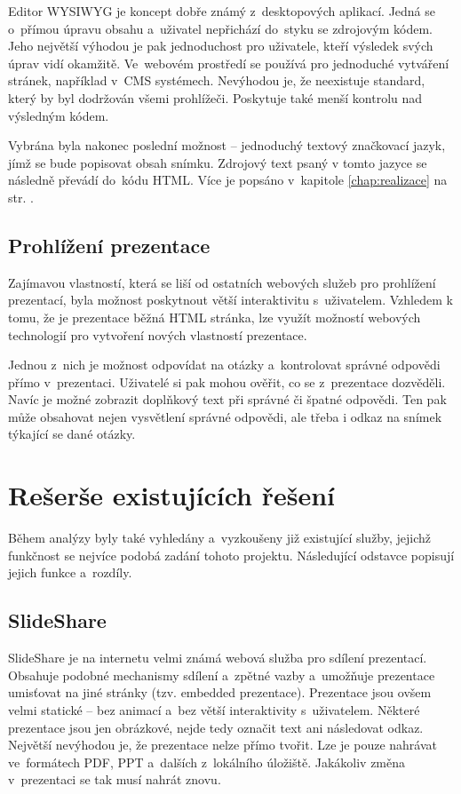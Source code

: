 \documentclass[11pt,twoside,a4paper]{book}
\begin{document}
Editor WYSIWYG je koncept dobře známý z~desktopových aplikací. Jedná se o~přímou úpravu obsahu a~uživatel nepřichází do~styku se zdrojovým kódem. Jeho největší výhodou je pak jednoduchost pro uživatele, kteří výsledek svých úprav vidí okamžitě. Ve~webovém prostředí se používá pro jednoduché vytváření stránek, například v~CMS systémech. Nevýhodou je, že neexistuje standard, který by byl dodržován všemi prohlížeči. Poskytuje také menší kontrolu nad výsledným kódem. 

Vybrána byla nakonec poslední možnost – jednoduchý textový značkovací jazyk, jímž se bude popisovat obsah snímku. Zdrojový text psaný v tomto jazyce se následně převádí do~kódu HTML. Více je popsáno v~kapitole \ref{chap:realizace}  na str. \pageref{chap:realizace}.

\subsection{Prohlížení prezentace}
Zajímavou vlastností, která se liší od ostatních webových služeb pro prohlížení prezentací, byla možnost poskytnout větší interaktivitu s~uživatelem. Vzhledem k tomu, že je prezentace běžná HTML stránka, lze využít možností webových technologií pro vytvoření nových vlastností prezentace.

Jednou z~nich je možnost odpovídat na otázky a~kontrolovat správné odpovědi přímo v~prezentaci. Uživatelé si pak mohou ověřit, co se z~prezentace dozvěděli. Navíc je možné zobrazit doplňkový text při správné či špatné odpovědi. Ten pak může obsahovat nejen vysvětlení správné odpovědi, ale třeba i odkaz na snímek týkající se dané otázky.


\section{Rešerše existujících řešení} \label{chap:existujiciSystemy}
Během analýzy byly také vyhledány a~vyzkoušeny již existující služby, jejichž funkčnost se nejvíce podobá zadání tohoto projektu. Následující odstavce popisují jejich funkce a~rozdíly.


\subsection{SlideShare}
SlideShare \cite{slideshare} je na internetu velmi známá webová služba pro sdílení prezentací. Obsahuje podobné mechanismy sdílení a~zpětné vazby a~umožňuje prezentace umisťovat na jiné stránky (tzv. embedded prezentace). Prezentace jsou ovšem velmi statické – bez animací a~bez větší interaktivity s~uživatelem. Některé prezentace jsou jen obrázkové, nejde tedy označit text ani následovat odkaz. Největší nevýhodou je, že prezentace nelze přímo tvořit. Lze je pouze nahrávat ve~formátech PDF, PPT a~dalších z~lokálního úložiště. Jakákoliv změna v~prezentaci se tak musí nahrát znovu.
\end{document}
